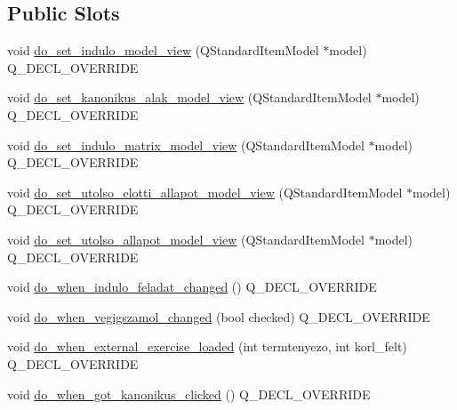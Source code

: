 \subsection*{Public Slots}
\begin{DoxyCompactItemize}
\item 
void \hyperlink{classMainvindow__gui__plugin__for__fules_a2429e357367c099081691f8012abdd84}{do\+\_\+set\+\_\+indulo\+\_\+model\+\_\+view} (Q\+Standard\+Item\+Model $\ast$model) Q\+\_\+\+D\+E\+C\+L\+\_\+\+O\+V\+E\+R\+R\+I\+DE
\item 
void \hyperlink{classMainvindow__gui__plugin__for__fules_af0223c6b7e5a8ab1a2c835811e61968e}{do\+\_\+set\+\_\+kanonikus\+\_\+alak\+\_\+model\+\_\+view} (Q\+Standard\+Item\+Model $\ast$model) Q\+\_\+\+D\+E\+C\+L\+\_\+\+O\+V\+E\+R\+R\+I\+DE
\item 
void \hyperlink{classMainvindow__gui__plugin__for__fules_a92ccf25dd20d9cd95bac846cee83b7f8}{do\+\_\+set\+\_\+indulo\+\_\+matrix\+\_\+model\+\_\+view} (Q\+Standard\+Item\+Model $\ast$model) Q\+\_\+\+D\+E\+C\+L\+\_\+\+O\+V\+E\+R\+R\+I\+DE
\item 
void \hyperlink{classMainvindow__gui__plugin__for__fules_a0199dc13ee862373b381eaf57716a943}{do\+\_\+set\+\_\+utolso\+\_\+elotti\+\_\+allapot\+\_\+model\+\_\+view} (Q\+Standard\+Item\+Model $\ast$model) Q\+\_\+\+D\+E\+C\+L\+\_\+\+O\+V\+E\+R\+R\+I\+DE
\item 
void \hyperlink{classMainvindow__gui__plugin__for__fules_ad441ae70c4b54bef9291ddf02d55619d}{do\+\_\+set\+\_\+utolso\+\_\+allapot\+\_\+model\+\_\+view} (Q\+Standard\+Item\+Model $\ast$model) Q\+\_\+\+D\+E\+C\+L\+\_\+\+O\+V\+E\+R\+R\+I\+DE
\item 
void \hyperlink{classMainvindow__gui__plugin__for__fules_a192a63d8fd779c87d88d8dde9626b59a}{do\+\_\+when\+\_\+indulo\+\_\+feladat\+\_\+changed} () Q\+\_\+\+D\+E\+C\+L\+\_\+\+O\+V\+E\+R\+R\+I\+DE
\item 
void \hyperlink{classMainvindow__gui__plugin__for__fules_aaab6c53ad37973164d334745ab2fbec5}{do\+\_\+when\+\_\+vegigszamol\+\_\+changed} (bool checked) Q\+\_\+\+D\+E\+C\+L\+\_\+\+O\+V\+E\+R\+R\+I\+DE
\item 
void \hyperlink{classMainvindow__gui__plugin__for__fules_a32904586a5f9f8512fb9d3bdd8b92f4b}{do\+\_\+when\+\_\+external\+\_\+exercise\+\_\+loaded} (int termtenyezo, int korl\+\_\+felt) Q\+\_\+\+D\+E\+C\+L\+\_\+\+O\+V\+E\+R\+R\+I\+DE
\item 
void \hyperlink{classMainvindow__gui__plugin__for__fules_ab18bc74a0030c8cc05853074589c1b77}{do\+\_\+when\+\_\+got\+\_\+kanonikus\+\_\+clicked} () Q\+\_\+\+D\+E\+C\+L\+\_\+\+O\+V\+E\+R\+R\+I\+DE

\end{DoxyCompactItemize}
